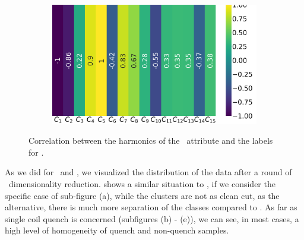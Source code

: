 \begin{figure}[!ht]
\begin{subfigure}{0.49\linewidth}
	\end{subfigure}
	\begin{subfigure}{0.49\linewidth}
		\includegraphics[width=\linewidth]{img/qlp_corr/Cnmod_coil3.png}
	\end{subfigure}
	\caption{Correlation between the harmonics of the \cnmod\ attribute and the labels for \qlp.}
	\label{fig:cnmod-lcorr-qlp}
\end{figure}

As we did for \an\ and \bn, we visualized the distribution of the data after a round of \pca\
dimensionality reduction.  shows a similar situation to \an, if we
consider the specific case of sub-figure (a), while the clusters are not as clean cut, as the
alternative, there is much more separation of the classes compared to \bn.
As far as single coil quench is concerned (subfigures (b) - (e)), we can see, in most cases, a high
level of homogeneity of quench and non-quench samples.

